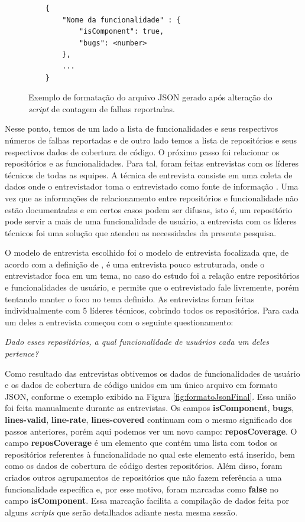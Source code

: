 \documentclass[11.5pt]{article}
\begin{document}
\begin{figure}[ht]
\caption{Exemplo de formatação do arquivo JSON gerado após alteração do \textit{script} de contagem
de falhas reportadas.}
\label{fig:formatoJsonBugs}
\small
\begin{verbatim}
    {
        "Nome da funcionalidade" : {
            "isComponent": true,
            "bugs": <number>
        },
        ...
    }
\end{verbatim}
\end{figure}

Nesse ponto, temos de um lado a lista de funcionalidades e seus respectivos números de falhas
reportadas e de outro lado temos a lista de repositórios e seus respectivos dados de cobertura
de código.
O próximo passo foi relacionar os repositórios e as funcionalidades.
Para tal, foram feitas entrevistas com os líderes técnicos de todas as equipes.
A técnica de entrevista consiste em uma coleta de dados onde o entrevistador toma o entrevistado
como fonte de informação \cite{metodosPesquisaSocial}.
Uma vez que as informações de relacionamento entre repositórios e funcionalidade não estão
documentadas e em certos casos podem ser difusas, isto é, um repositório pode servir a mais de uma
funcionalidade de usuário, a entrevista com os líderes técnicos foi uma solução que atendeu as
necessidades da presente pesquisa.

O modelo de entrevista escolhido foi o modelo de entrevista focalizada que, de acordo com a
definição de \cite{metodosPesquisaSocial}, é uma entrevista pouco estruturada, onde o entrevistador
foca em um tema, no caso do estudo foi a relação entre repositórios e funcionalidades de usuário,
e permite que o entrevistado fale livremente, porém tentando manter o foco no tema definido.
As entrevistas foram feitas individualmente com 5 líderes técnicos, cobrindo todos os repositórios.
Para cada um deles a entrevista começou com o seguinte questionamento:

\begin{center}
\textit{Dado esses repositórios, a qual funcionalidade de usuários cada um deles pertence?}
\end{center}

Como resultado das entrevistas obtivemos os dados de funcionalidades de usuário e os dados de
cobertura de código unidos em um único arquivo em formato JSON, conforme o exemplo exibido na
Figura \ref{fig:formatoJsonFinal}.
Essa união foi feita manualmente durante as entrevistas.
Os campos \textbf{isComponent}, \textbf{bugs}, \textbf{lines-valid}, \textbf{line-rate},
\textbf{lines-covered} continuam com o mesmo significado dos passos anteriores, porém aqui podemos
ver um novo campo: \textbf{reposCoverage}.
O campo \textbf{reposCoverage} é um elemento que contém uma lista com todos os repositórios
referentes à funcionalidade no qual este elemento está inserido, bem como os dados de cobertura de
código destes repositórios.
Além disso, foram criados outros agrupamentos de repositórios que não fazem referência a uma
funcionalidade específica e, por esse motivo, foram marcadas como \textbf{false} no campo
\textbf{isComponent}.
Essa marcação facilita a compilação de dados feita por alguns \textit{scripts} que serão detalhados
adiante nesta mesma sessão.
\end{document}
